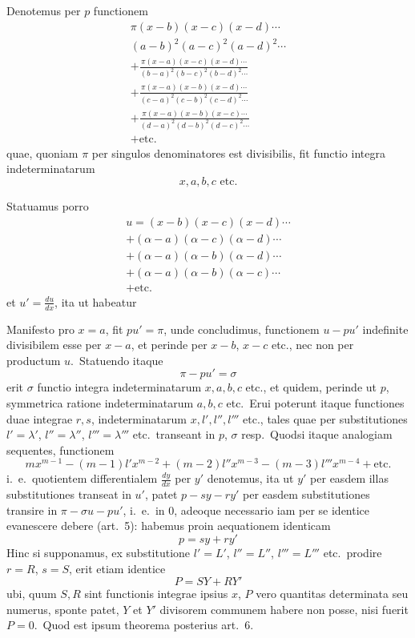 \documentclass[12pt,a4paper]{article}
\theoremstyle{plain}
\begin{document}
Denotemus per $p$ functionem
\begin{multline*}
\pi(x-b)(x-c)(x-d) \cdots \\
(a-b)^2(a-c)^2(a-d)^2 \cdots \\
+ \frac{\pi(x-a)(x-c)(x-d) \cdots}{(b-a)^2(b-c)^2(b-d)^2 \cdots} \\
+ \frac{\pi(x-a)(x-b)(x-d) \cdots}{(c-a)^2(c-b)^2(c-d)^2 \cdots} \\
+ \frac{\pi(x-a)(x-b)(x-c) \cdots}{(d-a)^2(d-b)^2(d-c)^2 \cdots} \\
+ \text{etc.}
\end{multline*}
quae, quoniam $\pi$ per singulos denominatores est divisibilis, fit functio integra
indeterminatarum
\[
x, a, b, c \text{ etc.}
\]

Statuamus porro
\begin{multline*}
u = (x-b)(x-c)(x-d) \cdots \\
+ (\alpha-a)(\alpha-c)(\alpha-d) \cdots \\
+ (\alpha-a)(\alpha-b)(\alpha-d) \cdots \\
+ (\alpha-a)(\alpha-b)(\alpha-c) \cdots \\
+ \text{etc.}
\end{multline*}
et $u' = \frac{du}{dx}$, ita ut habeatur

Manifesto pro $x = a$, fit $pu' = \pi$, unde concludimus, functionem $u - pu'$ indefinite divisibilem esse per $x - a$, et perinde per $x - b$, $x - c$ etc., nec non
per productum $u$.\ Statuendo itaque
\[
\pi - p u' = \sigma
\]
erit $\sigma$ functio integra indeterminatarum $x, a, b, c$ etc., et quidem, perinde ut $p$,
symmetrica ratione indeterminatarum $a, b, c$ etc.\ Erui poterunt itaque functiones duae integrae $r, s$, indeterminatarum $x, l', l'', l'''$ etc., tales quae per substitutiones $l' = \lambda'$, $l'' = \lambda''$, $l''' = \lambda'''$ etc.\ transeant in $p$, $\sigma$ resp.\ Quodsi itaque analogiam sequentes, functionem
\[
mx^{m-1} - (m-1)l'x^{m-2} + (m-2)l''x^{m-3} - (m-3)l'''x^{m-4} + \text{etc.}
\]
i.\ e.\ quotientem differentialem $\frac{dy}{dx}$ per $y'$ denotemus, ita ut $y'$ per easdem illas
substitutiones transeat in $u'$, patet $p - sy - ry'$ per easdem substitutiones transire
in $\pi - \sigma u - pu'$, i.\ e.\ in $0$, adeoque necessario iam per se identice evanescere
debere (art.\ 5): habemus proin aequationem identicam
\[
p = sy + ry'
\]
Hinc si supponamus, ex substitutione $l' = L'$, $l'' = L''$, $l''' = L'''$ etc.\ prodire
$r = R$, $s = S$, erit etiam identice
\[
P = SY + RY'
\]
ubi, quum $S, R$ sint functionis integrae ipsius $x$, $P$ vero quantitas determinata
seu numerus, sponte patet, $Y$ et $Y'$ divisorem communem habere non posse, nisi
fuerit $P = 0$.\ Quod est ipsum theorema posterius art.\ 6.
\end{document}
